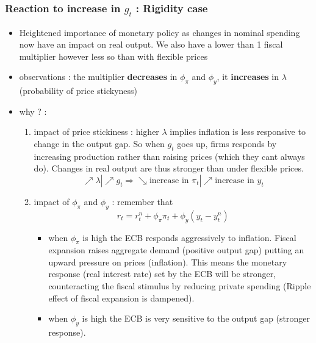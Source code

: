 \documentclass{article}
\begin{document}
\subsubsection{Reaction to increase in $g_t$ : Rigidity case}
\begin{itemize}
    \item Heightened importance of monetary policy as changes in nominal spending now have an impact on real output. We also have a lower than 1 fiscal multiplier however less so than with flexible prices 
    \item observations : the multiplier \textbf{decreases} in $\phi_\pi$ and $\phi_y$, it \textbf{increases} in $\lambda$ (probability of price stickyness)
    \item why ? : 
    \begin{enumerate}
        \item impact of price stickiness : higher $\lambda$ implies inflation is less responsive to change in the output gap. So when $g_t$ goes up, firms responds by increasing production rather than raising prices (which they cant always do). Changes in real output are thus stronger than under flexible prices. 
        \begin{equation}
            \nearrow \lambda |\nearrow g_t \Longrightarrow \searrow \text{increase in $\pi_t$}|\nearrow \text{increase in $y_t$} 
        \end{equation}
        \item impact of $\phi_\pi$ and $\phi_y$ : remember that 
        \begin{equation}
            r_t = r_t^n + \phi_\pi\pi_t + \phi_y(y_t-y_t^n)
        \end{equation}
        \begin{itemize}
            \item when $\phi_\pi$ is high the ECB responds aggressively to inflation. Fiscal expansion raises aggregate demand (positive output gap) putting an upward pressure on prices (inflation). This means the monetary response (real interest rate) set by the ECB will be stronger, counteracting the fiscal stimulus by reducing private spending (Ripple effect of fiscal expansion is dampened).
            \item when $\phi_y$ is high the ECB is very sensitive to the output gap (stronger response). 
        \end{itemize}
    \end{enumerate}
\end{itemize}
\end{document}
